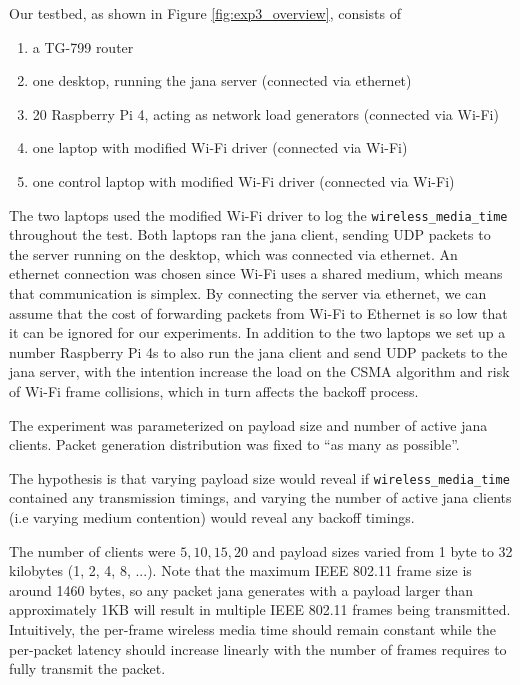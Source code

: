 Our testbed, as shown in Figure \ref{fig:exp3_overview}, consists of

\begin{enumerate}
  \item a TG-799 router
  \item one desktop, running the jana server (connected via ethernet)
  \item 20 Raspberry Pi 4, acting as network load generators (connected via Wi-Fi)
  \item one laptop with modified Wi-Fi driver (connected via Wi-Fi)
  \item one control laptop with modified Wi-Fi driver (connected via Wi-Fi)
\end{enumerate}

The two laptops used the modified Wi-Fi driver to log the
\texttt{wireless\_media\_time} throughout the test. Both laptops ran the jana
client, sending UDP packets to the server running on the desktop, which was
connected via ethernet. An ethernet connection was chosen since Wi-Fi uses a
shared medium, which means that communication is simplex. By connecting the
server via ethernet, we can assume that the cost of forwarding packets from
Wi-Fi to Ethernet is so low that it can be ignored for our experiments. In
addition to the two laptops we set up a number Raspberry Pi 4s to also run the
jana client and send UDP packets to the jana server, with the intention
increase the load on the CSMA algorithm and risk of Wi-Fi frame collisions,
which in turn affects the backoff process.

The experiment was parameterized on payload size and number of active jana
clients. Packet generation distribution was fixed to ``as many as possible''.

The hypothesis is that varying payload size would reveal if
\texttt{wireless\_media\_time} contained any transmission timings, and varying
the number of active jana clients (i.e varying medium contention) would reveal
any backoff timings.

The number of clients were ${5,10,15,20}$ and payload sizes varied from 1 byte
to 32 kilobytes (1, 2, 4, 8, ...). Note that the maximum IEEE 802.11 frame
size is around 1460 bytes, so any packet jana generates with a payload larger
than approximately 1KB will result in multiple IEEE 802.11 frames being
transmitted. Intuitively, the per-frame wireless media time should remain
constant while the per-packet latency should increase linearly with the number
of frames requires to fully transmit the packet.



